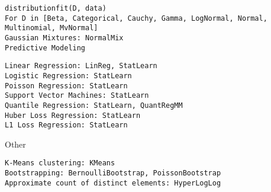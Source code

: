 \documentclass[Master.tex]{subfiles}
\begin{document}
\begin{frame}[fragile]
	\begin{verbatim}
distributionfit(D, data)
For D in [Beta, Categorical, Cauchy, Gamma, LogNormal, Normal, Multinomial, MvNormal]
Gaussian Mixtures: NormalMix
Predictive Modeling
\end{verbatim}
\end{frame}
\begin{frame}[fragile]
	\begin{verbatim}
Linear Regression: LinReg, StatLearn
Logistic Regression: StatLearn
Poisson Regression: StatLearn
Support Vector Machines: StatLearn
Quantile Regression: StatLearn, QuantRegMM
Huber Loss Regression: StatLearn
L1 Loss Regression: StatLearn
\end{verbatim}
\end{frame}
\begin{frame}[fragile]
Other
\begin{verbatim}
K-Means clustering: KMeans
Bootstrapping: BernoulliBootstrap, PoissonBootstrap
Approximate count of distinct elements: HyperLogLog
\end{verbatim}

\end{frame}
\end{document}
